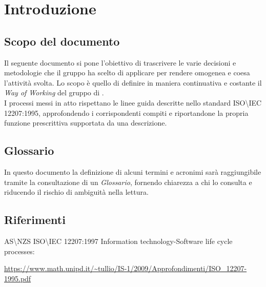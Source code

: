 \chapter{Introduzione}

\section{Scopo del documento}
Il seguente documento si pone l'obiettivo di trascrivere le varie decisioni e metodologie che il gruppo ha scelto di applicare per rendere omogenea e coesa l'attività svolta. Lo scopo è quello di definire in maniera continuativa e costante il \emph{Way of Working} del gruppo di .\\
I processi messi in atto rispettano le linee guida descritte nello standard ISO\textbackslash IEC 12207:1995, approfondendo i corrispondenti compiti e riportandone la propria funzione prescrittiva supportata da una descrizione.

\section{Glossario}
In questo documento la definizione di alcuni termini e acronimi sarà raggiungibile tramite la consultazione di un \textit{Glossario}, fornendo chiarezza a chi lo consulta e riducendo il rischio di ambiguità nella lettura.

\section{Riferimenti}
AS\textbackslash NZS ISO\textbackslash IEC 12207:1997 Information technology-Software life cycle processes:\\
\begin{footnotesize}
    \url{https://www.math.unipd.it/~tullio/IS-1/2009/Approfondimenti/ISO_12207-1995.pdf}
\end{footnotesize}
